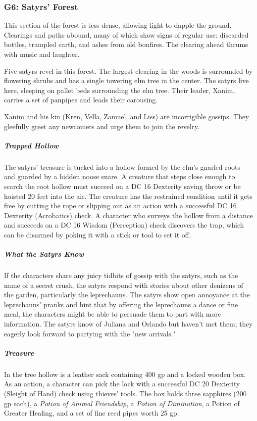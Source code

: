\documentclass[10pt,a4paper,twoside,bg=print,twocolumn,openany,nodeprecatedcode]{dndbook}
\begin{document}
\subsubsection{G6: Satyrs' Forest}
\begin{DndReadAloud}{}
This section of the forest is less dense, allowing light to dapple the ground. Clearings and paths abound, many of which show signs of regular use: discarded bottles, trampled earth, and ashes from old bonfires. The clearing ahead thrums with music and laughter.

\end{DndReadAloud}

Five satyrs revel in this forest. The largest clearing in the woods is surrounded by flowering shrubs and has a single towering elm tree in the center. The satyrs live here, sleeping on pallet beds surrounding the elm tree. Their leader, Xanim, carries a set of panpipes and leads their carousing.

Xanim and his kin (Kren, Vella, Zamuel, and Liss) are incorrigible gossips. They gleefully greet any newcomers and urge them to join the revelry.

\subparagraph{Trapped Hollow}
The satyrs' treasure is tucked into a hollow formed by the elm's gnarled roots and guarded by a hidden noose snare. A creature that steps close enough to search the root hollow must succeed on a DC 16 Dexterity saving throw or be hoisted 20 feet into the air. The creature has the restrained condition until it gets free by cutting the rope or slipping out as an action with a successful DC 16 Dexterity (Acrobatics) check. A character who surveys the hollow from a distance and succeeds on a DC 16 Wisdom (Perception) check discovers the trap, which can be disarmed by poking it with a stick or tool to set it off.

\subparagraph{What the Satyrs Know}
If the characters share any juicy tidbits of gossip with the satyrs, such as the name of a secret crush, the satyrs respond with stories about other denizens of the garden, particularly the leprechauns. The satyrs show open annoyance at the leprechauns' pranks and hint that by offering the leprechauns a dance or fine meal, the characters might be able to persuade them to part with more information. The satyrs know of Juliana and Orlando but haven't met them; they eagerly look forward to partying with the "new arrivals."

\subparagraph{Treasure}
In the tree hollow is a leather sack containing 400 gp and a locked wooden box. As an action, a character can pick the lock with a successful DC 20 Dexterity (Sleight of Hand) check using thieves' tools. The box holds three sapphires (200 gp each), a \textit{Potion of Animal Friendship}, a \textit{Potion of Diminution}, a Potion of Greater Healing, and a set of fine reed pipes worth 25 gp.
\end{document}

